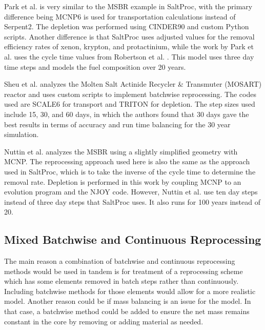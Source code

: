 Park et al. \cite{park_whole_2015} is very similar to the MSBR example in SaltProc, with the primary difference being MCNP6 is used for transportation calculations instead of Serpent2. The depletion was performed using CINDER90 and custom Python scripts. Another difference is that SaltProc uses adjusted values for the removal efficiency rates of xenon, krypton, and protactinium, while the work by Park et al. uses the cycle time values from Robertson et al. \cite{robertson_conceptual_1971}. This model uses three day time steps and models the fuel composition over 20 years.

Sheu et al. \cite{sheu_depletion_2013} analyzes the Molten Salt Actinide Recycler \& Transmuter (MOSART) reactor and uses custom scripts to implement batchwise reprocessing. The codes used are SCALE6 for transport and TRITON for depletion. The step sizes used include 15, 30, and 60 days, in which the authors found that 30 days gave the best results in terms of accuracy and run time balancing for the 30 year simulation.

Nuttin et al. \cite{nuttin_potential_2005} analyzes the MSBR using a slightly simplified geometry with MCNP. The reprocessing approach used here is also the same as the approach used in SaltProc, which is to take the inverse of the cycle time to determine the removal rate. Depletion is performed in this work by coupling MCNP to an evolution program and the NJOY code. However, Nuttin et al. use ten day steps instead of three day steps that SaltProc uses. It also runs for 100 years instead of 20.

\subsection{Mixed Batchwise and Continuous Reprocessing}
\label{litrev-msr-mixed}

The main reason a combination of batchwise and continuous reprocessing methods would be used in tandem is for treatment of a reprocessing scheme which has some elements removed in batch steps rather than continuously. Including batchwise methods for those elements would allow for a more realistic model. Another reason could be if mass balancing is an issue for the model. In that case, a batchwise method could be added to ensure the net mass remains constant in the core by removing or adding material as needed.

